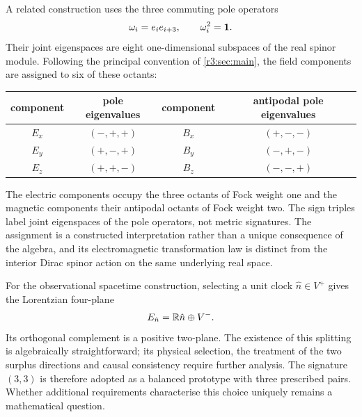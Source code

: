 A related construction uses the three commuting pole operators
\[
\omega_i=e_ie_{i+3},\qquad \omega_i^2=\mathbf 1 .
\]
Their joint eigenspaces are eight one-dimensional subspaces of the real spinor module. Following the principal convention of
\cref{r3:sec:main}, the field components are assigned to six of these octants:
\begin{center}
\begin{tabular}{@{}cccc@{}}
\toprule
component & pole eigenvalues & component & antipodal pole eigenvalues\\
\midrule
$E_x$ & $(-,+,+)$ & $B_x$ & $(+,-,-)$\\
$E_y$ & $(+,-,+)$ & $B_y$ & $(-,+,-)$\\
$E_z$ & $(+,+,-)$ & $B_z$ & $(-,-,+)$\\
\bottomrule
\end{tabular}
\end{center}
The electric components occupy the three octants of Fock weight one and the magnetic components their antipodal octants of Fock weight
two. The sign triples label joint eigenspaces of the pole operators, not metric signatures. The assignment is a constructed interpretation
rather than a unique consequence of the algebra, and its electromagnetic transformation law is distinct from the interior Dirac spinor
action on the same underlying real space.

For the observational spacetime construction, selecting a unit clock $\hat n\in V^+$ gives the Lorentzian four-plane
\[
E_{\hat n}=\mathbb{R}\hat n\oplus V^- .
\]
Its orthogonal complement is a positive two-plane. The existence of this splitting is algebraically straightforward; its physical
selection, the treatment of the two surplus directions and causal consistency require further analysis. The signature $(3,3)$ is
therefore adopted as a balanced prototype with three prescribed pairs. Whether additional requirements characterise this choice uniquely
remains a mathematical question.

